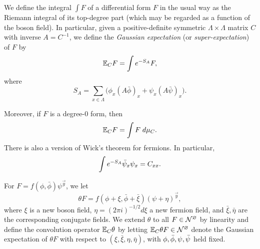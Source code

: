 We define the integral $\int F$ of a differential form $F$ in the usual way
as the Riemann integral of its top-degree part (which may be regarded as a function
of the boson field).
In particular, given a positive-definite symmetric
$\Lambda \times \Lambda$ matrix $C$ with inverse $A = C^{-1}$,
we define the \emph{Gaussian expectation} (or \emph{super-expectation}) of $F$ by
\begin{equation}
\lbeq{ExCF}
\Ex_C F = \int e^{-S_A} F,
\end{equation}
where
\begin{equation}
\label{e:action}
S_A = \sum_{x\in\Lambda} \Big(\phi_x (A\bar\phi)_x + \psi_x (A \bar\psi)_x\Big).
\end{equation}

Moreover, if $F$ is a degree-$0$ form, then
\begin{equation}
\mathbb{E}_C F = \int F \; d\mu_C.
\end{equation}
There is also a version of Wick's theorem for fermions. In particular,
\begin{equation}
\label{e:wick-fermion2}
\int e^{-S_A} {\bar\psi_x \psi_x} = C_{xx}.
\end{equation}

For $F = f(\phi, \bar\phi) \psi^{\vec y}$, we let
\begin{equation}
\theta F = f(\phi + \xi, \bar\phi + \bar\xi) (\psi + \eta)^{\vec y},
\end{equation}
where $\xi$ is a new boson field, $\eta = (2\pi i)^{-1/2} d\xi$ a new fermion field,
and $\bar\xi, \bar\eta$ are the corresponding conjugate fields.
We extend $\theta$ to all $F \in \mathcal{N}^\varnothing$ by linearity
and define the convolution operator $\mathbb{E}_C\theta$ by letting
$\mathbb{E}_C\theta F \in \mathcal{N}^\varnothing$ denote the Gaussian expectation of $\theta F$ with respect
to $(\xi, \bar\xi, \eta, \bar\eta)$, with $\phi,\bar\phi,\psi,\bar\psi$ held fixed.

